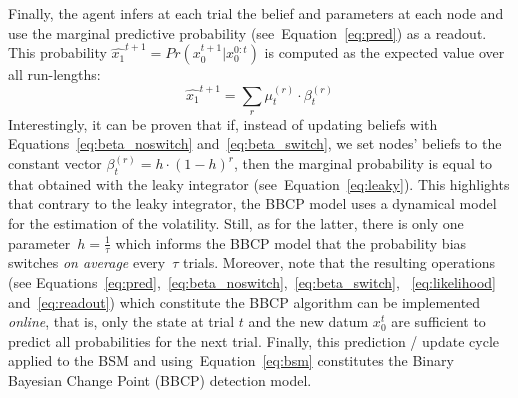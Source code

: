 \documentclass[12pt,english]{article}%
\newcommand{\eql}[1]{\begin{equation}#1\end{equation}}
\DeclareMathOperator{\argmax}{argmax}
\newcommand{\seeEq}[1]{Equation~\ref{eq:#1}}
\begin{document}
Finally, the agent infers at each trial the belief and parameters at each node
and use the marginal predictive probability (see~\seeEq{pred}) as a readout.
This probability $\hat{x_1}^{t+1}=Pr(x_0^{t+1} | x_0^{0:t})$ is computed as the expected value over all run-lengths:
\eql{
\hat{x_1}^{t+1} = \sum_{r} \mu^{(r)}_{t} \cdot \beta^{(r)}_{t}
\label{eq:readout}
}
Interestingly, it can be proven that if,
instead of updating beliefs with Equations~\ref{eq:beta_noswitch} and~\ref{eq:beta_switch},
we set nodes' beliefs to the constant vector $\beta^{(r)}_t = h \cdot (1 -h) ^r$, 
then the marginal probability is equal to that obtained with the leaky integrator (see~\seeEq{leaky}).
This highlights that contrary to the leaky integrator, %
the BBCP model uses a dynamical model for the estimation of the volatility.
Still, as for the latter, there is only one parameter~$h=\frac 1 \tau$ which informs the BBCP model
that the probability bias switches \emph{on average} every~$\tau$ trials.
Moreover, note that the resulting operations
(see Equations~\ref{eq:pred},~\ref{eq:beta_noswitch},~\ref{eq:beta_switch}, ~\ref{eq:likelihood} and~\ref{eq:readout})
which constitute the BBCP algorithm
can be implemented \textit{online}, that is,
only the state at trial $t$ and the new datum $x_0^t$
are sufficient to predict all probabilities for the next trial.
Finally, this prediction / update cycle applied to the BSM and using~\seeEq{bsm}
constitutes the Binary Bayesian Change Point (BBCP) detection model.

\end{document}
